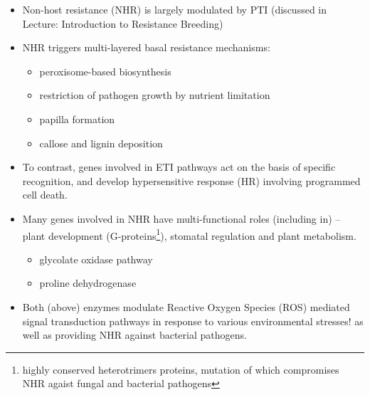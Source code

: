 \documentclass[11pt,dvipsnames,ignorenonframetext,aspectratio=169]{beamer}
\providecommand{\tightlist}{%
  \setlength{\itemsep}{0pt}\setlength{\parskip}{0pt}}
\begin{document}
\begin{frame}{}
\protect\hypertarget{section-13}{}
\small

\begin{itemize}
\tightlist
\item
  Non-host resistance (NHR) is largely modulated by PTI (discussed in
  Lecture: Introduction to Resistance Breeding)
\item
  NHR triggers multi-layered basal resistance mechanisms:

  \begin{itemize}
  \footnotesize
  \item peroxisome-based biosynthesis
  \item restriction of pathogen growth by nutrient limitation
  \item papilla formation
  \item callose and lignin deposition
  \end{itemize}
\item
  To contrast, genes involved in ETI pathways act on the basis of
  specific recognition, and develop hypersensitive response (HR)
  involving programmed cell death.
\item
  Many genes involved in NHR have multi-functional roles (including in)
  -- plant development
  (G-proteins\footnote[frame]{\scriptsize highly conserved heterotrimers proteins, mutation of which compromises NHR agaist fungal and bacterial pathogens}),
  stomatal regulation and plant metabolism.

  \begin{itemize}
  \footnotesize
  \item glycolate oxidase pathway
  \item proline dehydrogenase
  \end{itemize}
\item
  Both (above) enzymes modulate Reactive Oxygen Species (ROS) mediated
  signal transduction pathways in response to various environmental
  stresses! as well as providing NHR against bacterial pathogens.
\end{itemize}
\end{frame}
\end{document}
